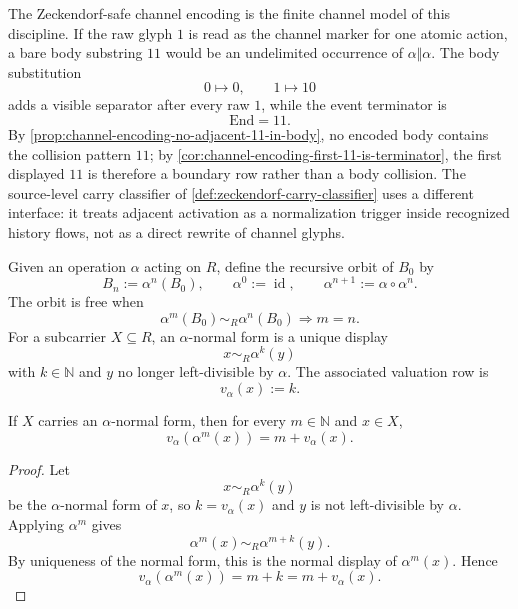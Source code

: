 \begin{principle}
\label{prin:axiszeckendorf-zeckendorf-safe-channel-collision-discipline}
The Zeckendorf-safe channel encoding is the finite channel model of this
discipline.  If the raw glyph $1$ is read as the channel marker for one
atomic action, a bare body substring $11$ would be an undelimited occurrence
of $\alpha\Vert\alpha$.  The body substitution
$$
0\mapsto0,
\qquad
1\mapsto10
$$
adds a visible separator after every raw $1$, while the event terminator is
$$
\mathrm{End}=11.
$$
By \autoref{prop:channel-encoding-no-adjacent-11-in-body}, no encoded body
contains the collision pattern $11$; by
\autoref{cor:channel-encoding-first-11-is-terminator}, the first displayed
$11$ is therefore a boundary row rather than a body collision.  The
source-level carry classifier of \autoref{def:zeckendorf-carry-classifier}
uses a different interface: it treats adjacent activation as a
normalization trigger inside recognized history flows, not as a direct
rewrite of channel glyphs.
\end{principle}

\begin{definition}
\label{def:axiszeckendorf-recursive-orbit-alpha-valuation}
Given an operation $\alpha$ acting on $R$, define the recursive orbit of
$B_0$ by
$$
B_n:=\alpha^n(B_0),
\qquad
\alpha^0:=\operatorname{id},
\qquad
\alpha^{n+1}:=\alpha\circ\alpha^n.
$$
The orbit is free when
$$
\alpha^m(B_0)\sim_R\alpha^n(B_0)
\Longrightarrow
m=n.
$$
For a subcarrier $X\subseteq R$, an $\alpha$-normal form is a unique
display
$$
x\sim_R\alpha^k(y)
$$
with $k\in\mathbb N$ and $y$ no longer left-divisible by $\alpha$.  The
associated valuation row is
$$
v_{\alpha}(x):=k.
$$
\end{definition}

\begin{theorem}
\label{thm:axiszeckendorf-alpha-valuation-shifts-additively}
If $X$ carries an $\alpha$-normal form, then for every $m\in\mathbb N$ and
$x\in X$,
$$
v_{\alpha}(\alpha^m(x))=m+v_{\alpha}(x).
$$
\end{theorem}

\begin{proof}
Let
$$
x\sim_R\alpha^k(y)
$$
be the $\alpha$-normal form of $x$, so $k=v_{\alpha}(x)$ and $y$ is not
left-divisible by $\alpha$.  Applying $\alpha^m$ gives
$$
\alpha^m(x)\sim_R\alpha^{m+k}(y).
$$
By uniqueness of the normal form, this is the normal display of
$\alpha^m(x)$.  Hence
$$
v_{\alpha}(\alpha^m(x))=m+k=m+v_{\alpha}(x).
$$
\end{proof}

